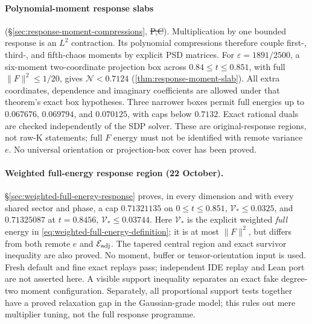 \paragraph{Polynomial-moment response slabs}
(\S\ref{sec:response-moment-compressions}, \st{P,C}). Multiplication by
one bounded response is an $L^2$ contraction. Its polynomial compressions
therefore couple first-, third-, and fifth-chaos moments by explicit PSD
matrices. For $\varepsilon=1891/2500$, a six-moment two-coordinate
projection box across $0.84\le t\le0.851$, with full $\|F\|^2\le1/20$,
gives $\mathcal N<0.7124$ (\autoref{thm:response-moment-slab}).
All extra coordinates, dependence and imaginary coefficients are allowed
under that theorem's exact box hypotheses. Three narrower boxes permit
full energies up to $0.067676$, $0.069794$, and $0.070125$, with caps
below $0.7132$. Exact rational duals are checked independently of the SDP
solver. These are original-response regions, not raw-K statements;
full $F$ energy must not be identified with remote variance $e$.
No universal orientation or projection-box cover has been proved.

\paragraph{Weighted full-energy response region (22 October).}
\S\ref{sec:weighted-full-energy-response} proves, in every dimension
and with every shared sector and phase, a cap $0.71321135$ on
$0\le t\le0.851$, $\mathcal V_*\le0.0325$, and $0.71325087$ at
$t=0.8456$, $\mathcal V_*\le0.03744$. Here $\mathcal V_*$ is the
explicit weighted \emph{full} energy in
\eqref{eq:weighted-full-energy-definition}; it is at most $\|F\|^2$,
but differs from both remote $e$ and $\mathcal E_{\rm adj}$.
The tapered central region and exact survivor inequality are also proved.
No moment, buffer or tensor-orientation input is used. Fresh default and
fine exact replays pass; independent IDE replay and Lean port are not
asserted here. A visible support inequality separates an exact fake
degree-two moment configuration. Separately, all proportional support
tests together have a proved relaxation gap in the Gaussian-grade model;
this rules out mere multiplier tuning, not the full response programme.


